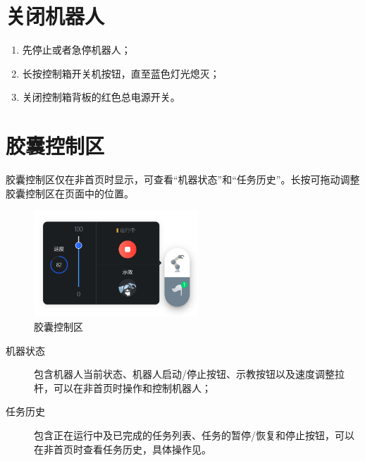 
\section{关闭机器人}
\begin{enumerate}
	\item 先停止或者急停机器人；
	\item 长按控制箱开关机按钮，直至蓝色灯光熄灭；
	\item 关闭控制箱背板的红色总电源开关。
\end{enumerate}


\section{胶囊控制区}
胶囊控制区仅在非首页时显示，可查看“机器状态”和“任务历史”。长按可拖动调整胶囊控制区在页面中的位置。

\begin{figure}[hb]
	\centering
	\includegraphics[height=4cm]{screen/2-18.png}
	\caption{胶囊控制区}
	\label{fig:胶囊控制区}
\end{figure}

\begin{description}
	\item [机器状态] 包含机器人当前状态、机器人启动/停止按钮、示教按钮以及速度调整拉杆，可以在非首页时操作和控制机器人；
	\item [任务历史] 包含正在运行中及已完成的任务列表、任务的暂停/恢复和停止按钮，可以在非首页时查看任务历史，具体操作见。
\end{description}
